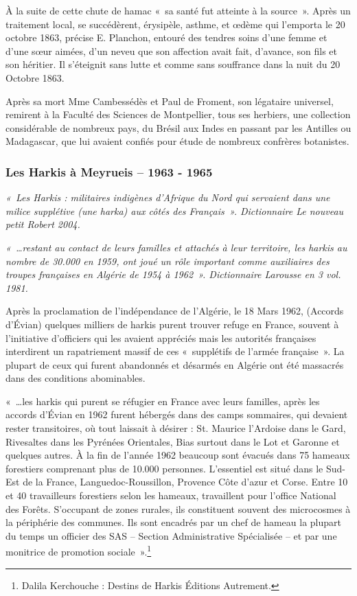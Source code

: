 À la suite de cette chute de hamac «~sa santé fut atteinte à la source~». Après un traitement
local, se succédèrent, érysipèle, asthme, et œdème qui l’emporta le 20 octobre 1863, précise
E. Planchon, entouré des tendres soins d’une femme et d’une sœur aimées, d’un neveu que
son affection avait fait, d’avance, son fils et son héritier. Il s’éteignit sans lutte et comme sans
souffrance dans la nuit du 20 Octobre 1863.

Après sa mort Mme Cambessédès et Paul de Froment, son légataire universel, remirent à la
Faculté des Sciences de Montpellier, tous ses herbiers, une collection considérable de
nombreux pays, du Brésil aux Indes en passant par les Antilles ou Madagascar, que lui
avaient confiés pour étude de nombreux confrères botanistes.

\subsubsection{Les Harkis à Meyrueis -- 1963 - 1965}


\textit{«~Les Harkis : militaires indigènes d’Afrique du Nord qui servaient dans une milice
supplétive (une harka) aux côtés des Français~». Dictionnaire Le nouveau petit Robert 2004.}

\textit{«~…restant au contact de leurs familles et attachés à leur territoire, les harkis au
nombre de 30.000 en 1959, ont joué un rôle important comme auxiliaires des troupes
françaises en Algérie de 1954 à 1962~». Dictionnaire Larousse en 3 vol. 1981.}

Après la proclamation de l’indépendance de l’Algérie, le 18 Mars 1962, (Accords
d’Évian) quelques milliers de harkis purent trouver refuge en France, souvent à
l’initiative d’officiers qui les avaient appréciés mais les autorités françaises interdirent
un rapatriement massif de ces «~supplétifs de l’armée française~». La plupart de ceux
qui furent abandonnés et désarmés en Algérie ont été massacrés dans des conditions
abominables.

«~…les harkis qui purent se réfugier en France avec leurs familles, après les accords
d’Évian en 1962 furent hébergés dans des camps sommaires, qui devaient rester
transitoires, où tout laissait à désirer : St. Maurice l’Ardoise dans le Gard, Rivesaltes
dans les Pyrénées Orientales, Bias surtout dans le Lot et Garonne et quelques autres.
À la fin de l’année 1962 beaucoup sont évacués dans 75 hameaux forestiers
comprenant plus de 10.000 personnes. L’essentiel est situé dans le Sud-Est de la
France, Languedoc-Roussillon, Provence Côte d’azur et Corse. Entre 10 et 40
travailleurs forestiers selon les hameaux, travaillent pour l’office National des
Forêts. S’occupant de zones rurales, ils constituent souvent des microcosmes à la
périphérie des communes. Ils sont encadrés par un chef de hameau la plupart du temps
un officier des SAS -- Section Administrative Spécialisée -- et par une monitrice de promotion
sociale~».\footnote{Dalila Kerchouche : Destins de Harkis Éditions Autrement.}

